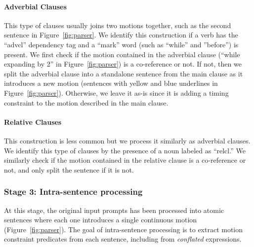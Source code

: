 \paragraph{Adverbial Clauses}
This type of clauses usually joins two motions together, such as the
second sentence in Figure~\ref{fig:parser}.  We identify this
construction if a verb has the ``advcl'' dependency tag and a ``mark''
word (such as ``while'' and ''before'') is present. 
%
We first check if the motion contained in the adverbial clause (``while expanding by 2'' in Figure~\ref{fig:parser}) is a co-reference or not.  
If not, then we split the adverbial clause into a standalone sentence from the main clause as it introduces a new motion (sentences with yellow and blue underlines in Figure~\ref{fig:parser}).
Otherwise, we leave it as-is since it is adding a timing constraint to the motion described in the main clause.

\paragraph{Relative Clauses}
This construction is less common but we process it similarly as
adverbial clauses.  We identify this type of clauses by the presence
of a noun labeled as ``relcl.''
We similarly check if the motion
contained in the relative clause is a co-reference or not, and only
split the sentence if it is not. 


\subsubsection{Stage 3: Intra-sentence processing}
At this stage, the original input prompts has been processed into
atomic sentences where each one introduces a single continuous motion
(Figure~\ref{fig:parser}).  The goal of intra-sentence processing is to extract
motion constraint predicates from each sentence, including from
\textit{conflated} expressions. 

